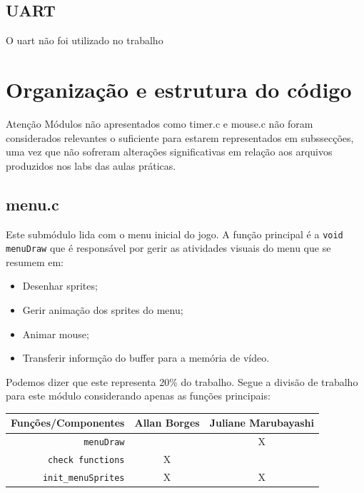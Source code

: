 \documentclass[12pt]{article}
\begin{document}
\subsection{UART}
O uart não foi utilizado no trabalho

\section{Organização e estrutura do código}
{\color{red}Atenção} Módulos não apresentados como timer.c e mouse.c não foram considerados relevantes o 
suficiente para estarem representados em subssecções, uma vez que não sofreram alterações 
significativas em relação aos arquivos produzidos nos labs das aulas práticas. \newline
\subsection{menu.c}
Este submódulo lida com o menu inicial do jogo.\newline
A função principal é a \texttt{void menuDraw} que é responsável por gerir as atividades visuais do menu
que se resumem em:
\begin{itemize}
    \item Desenhar sprites;
    \item Gerir animação dos sprites do menu;
    \item Animar mouse;
    \item Transferir informção do buffer para a memória de vídeo.
\end{itemize}
Podemos dizer que este representa 20\% do trabalho. \newline
Segue a divisão de trabalho para este módulo considerando apenas as funções principais: \newline
\begin{center}
    \begin{tabular}{|r|c|c|}
        \hline
        \textbf{Funções/Componentes} & \textbf{Allan Borges} & \textbf{Juliane Marubayashi} \\ 
        \hline
        \texttt{menuDraw}   & & X \\ 
        \texttt{check functions} & X & \\ 
        \texttt{init\_menuSprites} & X & X \\ 
        \hline
    \end{tabular}
\end{center}
\end{document}
